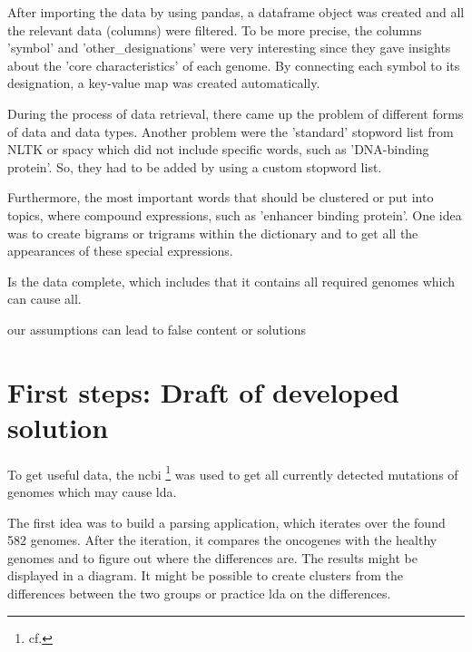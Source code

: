 After importing the data by using pandas, a dataframe object was created and all the relevant data (columns) were filtered. To be more precise, the columns 'symbol' and 'other_designations' were very interesting since they gave insights about the 'core characteristics' of each genome. By connecting each symbol to its designation, a key-value map was created automatically.


During the process of data retrieval, there came up the problem of different forms of data and data types. 
Another problem were the 'standard' stopword list from NLTK or spacy which did not include specific words, such as 'DNA-binding protein'. So, they had to be added by using a custom stopword list.

Furthermore, the most important words that should be clustered or put into topics, where compound expressions, such as 'enhancer binding protein'. One idea was to create bigrams or trigrams within the dictionary and to get all the appearances of these special expressions.

Is the data complete, which includes that it contains all required genomes which can cause \gls{all}.

our assumptions can lead to false content or solutions 

\section{First steps: Draft of developed solution}\label{draft}

To get useful data, the \gls{ncbi} \footnote{cf.\autocite{ncbi}} was used to get all currently detected mutations of genomes which may cause \gls{lda}.

The first idea was to build a parsing application, which iterates over the found 582 genomes. After the iteration, it compares the oncogenes with the healthy genomes and to figure out where the differences are. The results might be displayed in a diagram. It might be possible to create clusters from the differences between the two groups or practice \gls{lda} on the differences.


